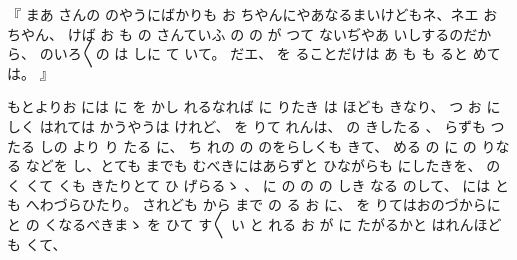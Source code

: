 
『
まあ
さんの
のやうにばかりも
お
ちやんにやあなるまいけどもネ、ネエ
お
ちやん、
けば
お
も
の
さんていふ
の
の
が
つて
ないぢやあ
いしするのだから、
のいろ〳〵の
は
しに
て
いて。
だエ、
を
ることだけは
あ
も
も
ると
めては。
』

もとよりお
には
に
を
かし
れるなれば
に
りたき
は
ほども
きなり、
つ
お
に
しく
はれては
かうやうは
けれど、
を
りて
れんは、
の
きしたる
、
らずも
つたる
しの
より
り
たる
に、
ち
れの
の
のをらしくも
きて、
める
の
に
の
りなる
などを
し、とても
までも
むべきにはあらずと
ひながらも
にしたきを、
の
く
くて
くも
きたりとて
ひ
げらるゝ
、
に
の
の
の
しき
なる
のして、
には
とも
へわづらひたり。
されども
から
まで
の
る
お
に、
を
りてはおのづからに
と
の
くなるべきまゝ
を
ひて
す〳〵
い
と
れる
お
が
に
たがるかと
はれんほども
くて、

